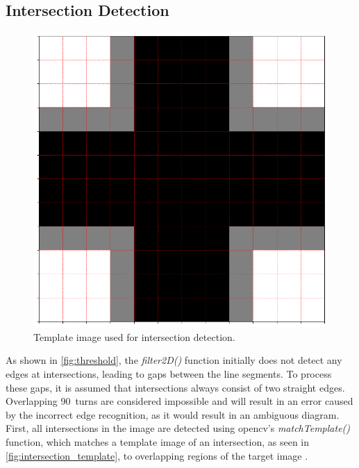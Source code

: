 \newpage
\subsection{Intersection Detection}
\label{sec:intersection_detection}
\begin{figure}
    \centering
    \includegraphics[width=\linewidth]{pictures/intersection_template.png}
    \caption[Intersection detection template]{Template image used for intersection detection.}
    \label{fig:intersection_template}
\end{figure}
As shown in \autoref{fig:threshold}, the \textit{filter2D()} function initially does not detect any edges at intersections, leading to gaps between the line segments. To process these gaps, it is assumed that intersections always consist of two straight edges. Overlapping 90\textdegree\ turns are considered impossible and will result in an error caused by the incorrect edge recognition, as it would result in an ambiguous diagram.\\
First, all intersections in the image are detected using \acrshort{opencv}'s \textit{matchTemplate()} function, which matches a template image of an intersection, as seen in \autoref{fig:intersection_template}, to overlapping regions of the target image \cite{opencv_matchTemplate_2024}.\\
